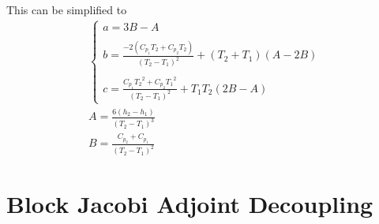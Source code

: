 \documentclass{article}   	%
\begin{document}
This can be simplified to
\begin{gather}
  \begin{cases}
    a=3B - A \\ \\
    b=\frac{-2(C_{p_1} T_2 + C_{p_2}T_2)}{(T_2 - T_1)^2} +(T_2+T_1) (A - 2B) \\ \\
    c=\frac{C_{p_1} {T_2}^2 + C_{p_2} {T_1}^2}{(T_2-T_1)^2} + T_1 T_2 (2B - A)
  \end{cases} \\
  A = \frac{6(h_2 - h_1)}{(T_2 - T_1)^3} \\
  B = \frac{C_{p_2} + C_{p_1}}{(T_2 - T_1)^2}
\end{gather}
\section{Block Jacobi Adjoint Decoupling}

\end{document}
